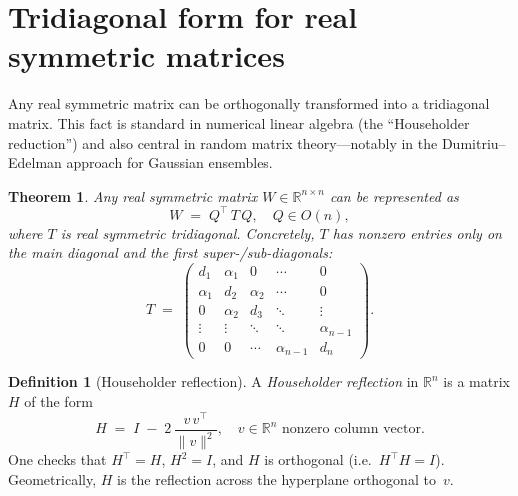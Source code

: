 \documentclass[letterpaper,11pt,oneside,reqno]{book}
\numberwithin{equation}{chapter}  %
\newtheorem{theorem}[proposition]{Theorem}
\theoremstyle{definition}
\newtheorem{definition}[proposition]{Definition}
\begin{document}
\section{Tridiagonal form for real symmetric matrices}
\label{lecture3:sec:householder}

Any real symmetric matrix can be orthogonally transformed into a tridiagonal matrix. This fact is standard in numerical linear algebra (the ``Householder reduction'') and also central in random matrix theory---notably in the Dumitriu--Edelman approach \cite{dumitriu2002matrix} for Gaussian ensembles.

\begin{theorem}
\label{lecture3:thm:tridiagonal}
Any real symmetric matrix \(W \in \mathbb{R}^{n\times n}\) can be represented as
\[
  W \;=\; Q^\top\, T\, Q,
  \quad
  Q \in O(n),
\]
where \(T\) is real symmetric tridiagonal.  Concretely, \(T\) has nonzero entries only on the main diagonal and the first super-/sub-diagonals:
\[
  T \;=\;
  \begin{pmatrix}
         d_1 & \alpha_1 & 0 & \cdots & 0\\
         \alpha_1 & d_2 & \alpha_2 & \cdots & 0\\
         0 & \alpha_2 & d_3 & \ddots & \vdots\\
         \vdots & \vdots & \ddots & \ddots & \alpha_{n-1}\\
         0 & 0 & \cdots & \alpha_{n-1} & d_n
  \end{pmatrix}.
\]
\end{theorem}

\begin{definition}[Householder reflection]
A \emph{Householder reflection} in \(\mathbb{R}^n\) is a matrix \(H\) of the form
\[
  H \;=\; I \;-\; 2\,\frac{v\,v^\top}{\|v\|^2},
  \quad
  v\in \mathbb{R}^n \text{ nonzero column vector}.
\]
One checks that \(H^\top = H\), \(H^2 = I\), and \(H\) is orthogonal (i.e.\ \(H^\top H = I\)).  Geometrically, \(H\) is the reflection across the hyperplane orthogonal to~\(v\).
\end{definition}
\end{document}

